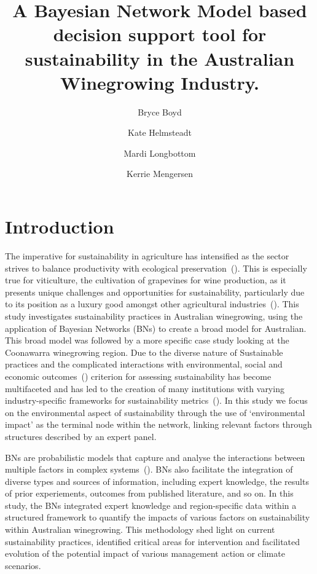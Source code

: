 \documentclass[fleqn,10pt]{wlscirep}
\title{A Bayesian Network Model based decision support tool for sustainability in the Australian Winegrowing Industry.}
\author[1,2,3,*]{Bryce Boyd}
\author[1]{Kate Helmsteadt}
\author[2]{Mardi Longbottom}
\author[1]{Kerrie Mengersen}
\affil[1]{QUT, Mathematical Sciences, Brisbane, Australia}
\affil[2]{AWRI, Adelaide, Australia}
\affil[3]{Food Agility CRC}
\affil[*]{bryce.polley@awri.com.au}
\begin{document}

\section*{Introduction}

The imperative for sustainability in agriculture has intensified as the sector strives to balance productivity with ecological preservation~(\cite{baianoOverviewSustainabilityWine2021,corboEnvironmentalSustainabilityPrograms2014}). This is especially true for viticulture, the cultivation of grapevines for wine production, as it presents unique challenges and opportunities for sustainability, particularly due to its position as a luxury good amongst other agricultural industries~(\cite{longbottomExploringLinksSustainability2018,ferraraLifeCycleAssessment2018}). This study investigates sustainability practices in Australian winegrowing, using the application of Bayesian Networks (BNs) to create a broad model for Australian. This broad model was followed by a more specific case study looking at the Coonawarra winegrowing region. Due to the diverse nature of Sustainable practices and the complicated interactions with environmental, social and economic outcomes~(\cite{beaumelleBiodiversityConservationEcosystem2023}) criterion for assessing sustainability has become multifaceted and has led to the creation of many institutions with varying industry-specific frameworks for sustainability metrics~(\cite{baianoOverviewSustainabilityWine2021,montalvo-falconSustainabilityResearchWine2023, wayeCarbonFootprintsFood2008}). In this study we focus on the environmental aspect of sustainability through the use of `environmental impact' as the terminal node within the network, linking relevant factors through structures described by an expert panel.

BNs are probabilistic models that capture and analyse the interactions between multiple factors in complex systems~(\cite{korbBayesianArtificialIntelligence2011}). BNs also facilitate the integration of diverse types and sources of information, including expert knowledge, the results of prior experiements, outcomes from published literature, and so on. In this study, the BNs integrated expert knowledge and region-specific data within a structured framework to quantify the impacts of various factors on sustainability within Australian winegrowing. This methodology shed light on current sustainability practices, identified critical areas for intervention and facilitated evolution of the potential impact of various management action or climate scenarios.
\end{document}
